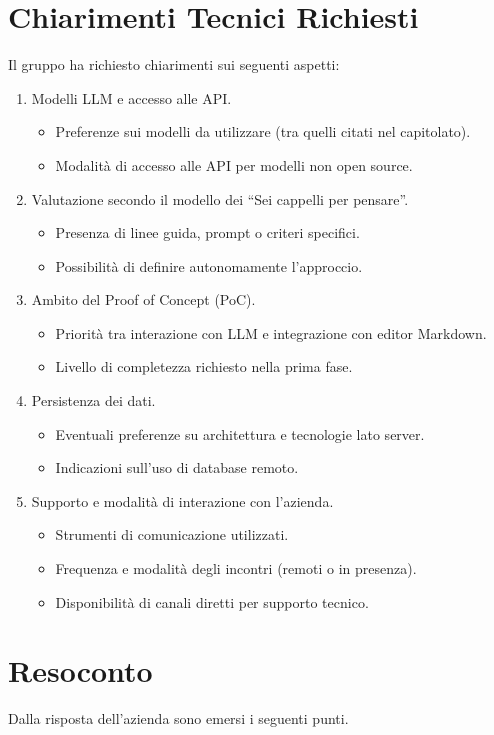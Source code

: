 \section{Chiarimenti Tecnici Richiesti}
Il gruppo ha richiesto chiarimenti sui seguenti aspetti:
\begin{enumerate}
	\item Modelli LLM e accesso alle API.
	\begin{itemize}
		\item Preferenze sui modelli da utilizzare (tra quelli citati nel capitolato).
		\item Modalità di accesso alle API per modelli non open source.
	\end{itemize}
	\item Valutazione secondo il modello dei “Sei cappelli per pensare”.
	\begin{itemize}
		\item Presenza di linee guida, prompt o criteri specifici.
		\item Possibilità di definire autonomamente l’approccio.
	\end{itemize}
	\item Ambito del Proof of Concept (PoC).
	\begin{itemize}
		\item Priorità tra interazione con LLM e integrazione con editor Markdown.
		\item Livello di completezza richiesto nella prima fase.
	\end{itemize}
	\item Persistenza dei dati.
	\begin{itemize}
		\item Eventuali preferenze su architettura e tecnologie lato server.
		\item Indicazioni sull’uso di database remoto.
	\end{itemize}
	\item Supporto e modalità di interazione con l’azienda.
	\begin{itemize}
		\item Strumenti di comunicazione utilizzati.
		\item Frequenza e modalità degli incontri (remoti o in presenza).
		\item Disponibilità di canali diretti per supporto tecnico.
	\end{itemize}
\end{enumerate}

\section{Resoconto}
Dalla risposta dell'azienda sono emersi i seguenti punti.

